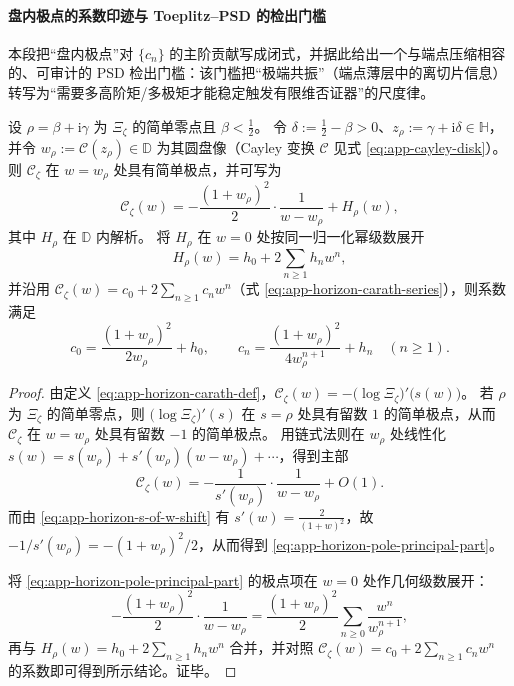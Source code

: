 
\paragraph{盘内极点的系数印迹与 Toeplitz--PSD 的检出门槛}
本段把“盘内极点”对 \(\{c_n\}\) 的主阶贡献写成闭式，并据此给出一个与端点压缩相容的、可审计的 PSD 检出门槛：该门槛把“极端共振”（端点薄层中的离切片信息）转写为“需要多高阶矩/多极矩才能稳定触发有限维否证器”的尺度律。

\begin{proposition}\label{prop:app-horizon-pole-imprint}
设 \(\rho=\beta+\mathrm{i}\gamma\) 为 \(\Xi_{\zeta}\) 的简单零点且 \(\beta<\tfrac12\)。
令 \(\delta:=\tfrac12-\beta>0\)、\(z_\rho:=\gamma+\mathrm{i}\delta\in\mathbb{H}\)，并令 \(w_\rho:=\mathcal{C}(z_\rho)\in\mathbb{D}\) 为其圆盘像（Cayley 变换 \(\mathcal{C}\) 见式 \eqref{eq:app-cayley-disk}）。
则 \(\mathscr{C}_{\zeta}\) 在 \(w=w_\rho\) 处具有简单极点，并可写为
\begin{equation}\label{eq:app-horizon-pole-principal-part}
\boxed{\;
\mathscr{C}_{\zeta}(w)
=-\frac{(1+w_\rho)^2}{2}\cdot\frac{1}{w-w_\rho}+H_\rho(w),\;}
\end{equation}
其中 \(H_\rho\) 在 \(\mathbb{D}\) 内解析。
将 \(H_\rho\) 在 \(w=0\) 处按同一归一化幂级数展开
\[
H_\rho(w)=h_0+2\sum_{n\ge 1}h_n w^n,
\]
并沿用 \(\mathscr{C}_{\zeta}(w)=c_0+2\sum_{n\ge 1}c_n w^n\)（式 \eqref{eq:app-horizon-carath-series}），则系数满足
\[
c_0=\frac{(1+w_\rho)^2}{2w_\rho}+h_0,
\qquad
c_n=\frac{(1+w_\rho)^2}{4w_\rho^{n+1}}+h_n\quad(n\ge 1).
\]
\end{proposition}

\begin{proof}
由定义 \eqref{eq:app-horizon-carath-def}，\(\mathscr{C}_{\zeta}(w)=-\bigl(\log\Xi_{\zeta}\bigr)'\!\bigl(s(w)\bigr)\)。
若 \(\rho\) 为 \(\Xi_{\zeta}\) 的简单零点，则 \(\bigl(\log\Xi_{\zeta}\bigr)'(s)\) 在 \(s=\rho\) 处具有留数 \(1\) 的简单极点，从而 \(\mathscr{C}_{\zeta}\) 在 \(w=w_\rho\) 处具有留数 \(-1\) 的简单极点。
用链式法则在 \(w_\rho\) 处线性化 \(s(w)=s(w_\rho)+s'(w_\rho)(w-w_\rho)+\cdots\)，得到主部
\[
\mathscr{C}_{\zeta}(w)
=-\frac{1}{s'(w_\rho)}\cdot\frac{1}{w-w_\rho}+O(1).
\]
而由 \eqref{eq:app-horizon-s-of-w-shift} 有 \(s'(w)=\frac{2}{(1+w)^2}\)，故 \(-1/s'(w_\rho)=-(1+w_\rho)^2/2\)，从而得到 \eqref{eq:app-horizon-pole-principal-part}。
\par
将 \eqref{eq:app-horizon-pole-principal-part} 的极点项在 \(w=0\) 处作几何级数展开：
\[
-\frac{(1+w_\rho)^2}{2}\cdot\frac{1}{w-w_\rho}
=\frac{(1+w_\rho)^2}{2}\sum_{n\ge 0}\frac{w^n}{w_\rho^{n+1}},
\]
再与 \(H_\rho(w)=h_0+2\sum_{n\ge 1}h_n w^n\) 合并，并对照 \(\mathscr{C}_{\zeta}(w)=c_0+2\sum_{n\ge 1}c_n w^n\) 的系数即可得到所示结论。证毕。
\end{proof}

